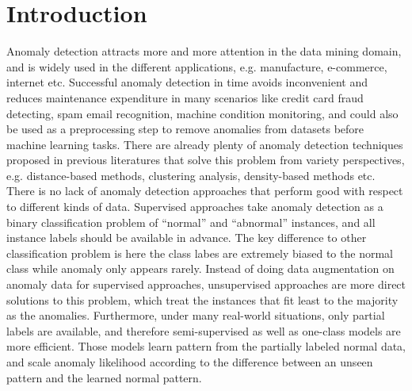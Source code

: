 \chapter{Introduction}
\label{chap:Introduction}

Anomaly detection attracts more and more attention in the data mining domain, and is widely used in the different applications, e.g. manufacture, e-commerce, internet etc. Successful anomaly detection in time avoids inconvenient and reduces maintenance expenditure in many scenarios like credit card fraud detecting, spam email recognition, machine condition monitoring, and could also be used as a preprocessing step to remove anomalies from datasets before machine learning tasks. There are already plenty of anomaly detection techniques proposed in previous literatures that solve this problem from variety perspectives, e.g. distance-based methods, clustering analysis, density-based methods etc.\\

There is no lack of anomaly detection approaches that perform good with respect to different kinds of data. Supervised approaches take anomaly detection as a binary classification problem of “normal” and “abnormal” instances, and all instance labels should be available in advance. The key difference to other classification problem is here the class labes are extremely biased to the normal class while anomaly only appears rarely. Instead of doing data augmentation on anomaly data for supervised approaches, unsupervised approaches are more direct solutions to this problem, which treat the instances that fit least to the majority as the anomalies. Furthermore, under many real-world situations, only partial labels are available, and therefore semi-supervised as well as one-class models are more efficient. 
Those models learn pattern from the partially labeled normal data, and 
scale anomaly likelihood according to the difference between an unseen pattern and the learned normal pattern.\\

